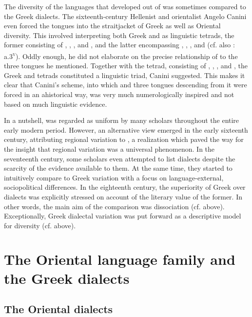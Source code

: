 The diversity of the  languages that developed out of  was sometimes compared to the Greek dialects. The sixteenth-century Hellenist and orientalist Angelo Canini even forced the  tongues into the straitjacket of Greek as well as Oriental diversity. This involved \citet[\textsc{a}.iii\textsc{\textsuperscript{r}}]{Canini1554} interpreting both Greek and  as linguistic tetrads, the former consisting of , , , and , and the latter encompassing , , , and  (cf. also \citealt{Canini1555}: a.3\textsc{\textsuperscript{v}}). Oddly enough, he did not elaborate on the precise relationship of  to the three  tongues he mentioned. Together with the  tetrad, consisting of , , , and , the Greek and  tetrads constituted a linguistic triad, Canini suggested. This makes it clear that Canini’s scheme, into which  and three  tongues descending from it were forced in an ahistorical way, was very much numerologically inspired and not based on much linguistic evidence.

In a nutshell,  was regarded as uniform by many scholars throughout the entire early modern period. However, an alternative view emerged in the early sixteenth century, attributing regional variation to , a realization which paved the way for the insight that regional variation was a universal phenomenon. In the seventeenth century, some scholars even attempted to list  dialects despite the scarcity of the evidence available to them. At the same time, they started to intuitively compare  to Greek variation with a focus on lan\-guage-ex\-ter\-nal, sociopolitical differences. In the eighteenth century, the superiority of Greek over  dialects was explicitly stressed on account of the literary value of the former. In other words, the main aim of the comparison was dissociation (cf.  above). Exceptionally, Greek dialectal variation was put forward as a descriptive model for  diversity (cf.  above).

\section{The Oriental language family and the Greek dialects}\label{sec:8.3}
\subsection{The Oriental dialects}\label{sec:8.3.1}

